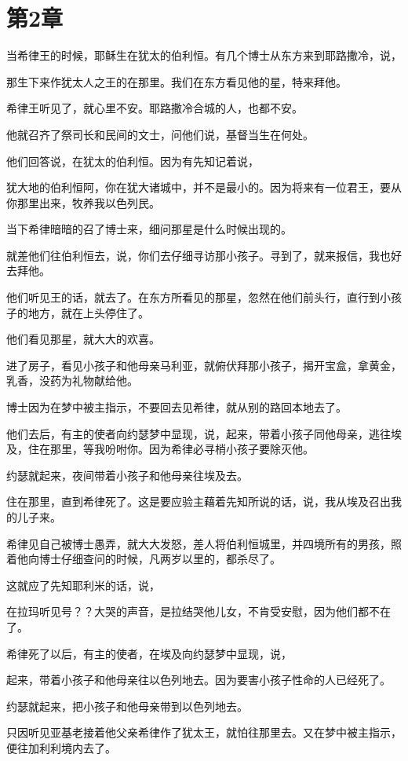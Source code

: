 \documentclass[12pt,oneside]{book}
\begin{document}
\chapter{第2章}
当希律王的时候，耶稣生在犹太的伯利恒。有几个博士从东方来到耶路撒冷，说，

那生下来作犹太人之王的在那里。我们在东方看见他的星，特来拜他。

希律王听见了，就心里不安。耶路撒冷合城的人，也都不安。

他就召齐了祭司长和民间的文士，问他们说，基督当生在何处。

他们回答说，在犹太的伯利恒。因为有先知记着说，

犹大地的伯利恒阿，你在犹大诸城中，并不是最小的。因为将来有一位君王，要从你那里出来，牧养我以色列民。

当下希律暗暗的召了博士来，细问那星是什么时候出现的。

就差他们往伯利恒去，说，你们去仔细寻访那小孩子。寻到了，就来报信，我也好去拜他。

他们听见王的话，就去了。在东方所看见的那星，忽然在他们前头行，直行到小孩子的地方，就在上头停住了。

他们看见那星，就大大的欢喜。

进了房子，看见小孩子和他母亲马利亚，就俯伏拜那小孩子，揭开宝盒，拿黄金，乳香，没药为礼物献给他。

博士因为在梦中被主指示，不要回去见希律，就从别的路回本地去了。

他们去后，有主的使者向约瑟梦中显现，说，起来，带着小孩子同他母亲，逃往埃及，住在那里，等我吩咐你。因为希律必寻梢小孩子要除灭他。

约瑟就起来，夜间带着小孩子和他母亲往埃及去。

住在那里，直到希律死了。这是要应验主藉着先知所说的话，说，我从埃及召出我的儿子来。

希律见自己被博士愚弄，就大大发怒，差人将伯利恒城里，并四境所有的男孩，照着他向博士仔细查问的时候，凡两岁以里的，都杀尽了。

这就应了先知耶利米的话，说，

在拉玛听见号？？大哭的声音，是拉结哭他儿女，不肯受安慰，因为他们都不在了。

希律死了以后，有主的使者，在埃及向约瑟梦中显现，说，

起来，带着小孩子和他母亲往以色列地去。因为要害小孩子性命的人已经死了。

约瑟就起来，把小孩子和他母亲带到以色列地去。

只因听见亚基老接着他父亲希律作了犹太王，就怕往那里去。又在梦中被主指示，便往加利利境内去了。
\end{document}
